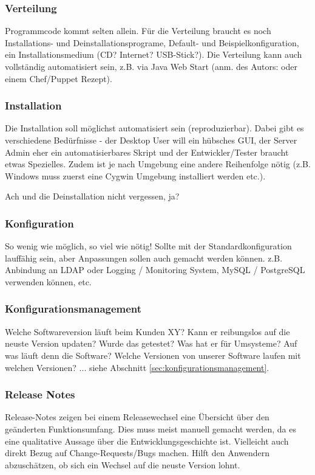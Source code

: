 \subsubsection{Verteilung}
Programmcode kommt selten allein. Für die Verteilung braucht es noch Installations- und Deinstallationsprograme, Default- und Beispielkonfiguration, ein Installationsmedium (CD? Internet? USB-Stick?). Die Verteilung kann auch vollständig automatisiert sein, z.B. via Java Web Start (anm. des Autors: oder einem Chef/Puppet Rezept).

\subsubsection{Installation}
Die Installation soll möglichst automatisiert sein (reproduzierbar). Dabei gibt es verschiedene Bedürfnisse - der Desktop User will ein hübsches GUI, der Server Admin eher ein automatisierbares Skript und der Entwickler/Tester braucht etwas Spezielles. Zudem ist je nach Umgebung eine andere Reihenfolge nötig (z.B. Windows muss zuerst eine Cygwin Umgebung installiert werden etc.). 

Ach und die Deinstallation nicht vergessen, ja?

\subsubsection{Konfiguration}
So wenig wie möglich, so viel wie nötig! Sollte mit der Standardkonfiguration lauffähig sein, aber Anpassungen sollen auch gemacht werden können. z.B. Anbindung an LDAP oder Logging / Monitoring System, MySQL / PostgreSQL verwenden können, etc.

\subsubsection{Konfigurationsmanagement}
Welche Softwareversion läuft beim Kunden XY? Kann er reibungslos auf die neuste Version updaten? Wurde das getestet? Was hat er für Umsysteme? Auf was läuft denn die Software? Welche Versionen von unserer Software laufen mit welchen Versionen? ... siehe Abschnitt \ref{sec:konfigurationsmanagement}.

\subsubsection{Release Notes}
Release-Notes zeigen bei einem Releasewechsel eine Übersicht über den geänderten Funktionsumfang. Dies muss meist manuell gemacht werden, da es eine qualitative Aussage über die Entwicklungsgeschichte ist. Vielleicht auch direkt Bezug auf Change-Requests/Bugs machen. Hilft den Anwendern abzuschätzen, ob sich ein Wechsel auf die neuste Version lohnt.

